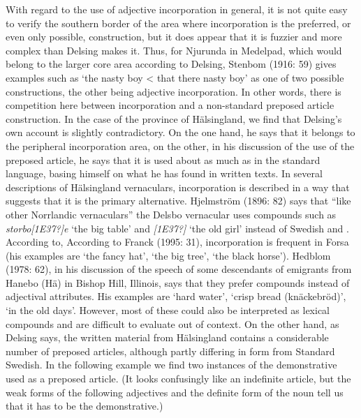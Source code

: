 With regard to the use of adjective incorporation in general, it is not quite easy to verify the southern border of the area where incorporation is the preferred, or even only possible, construction, but it does appear that it is fuzzier and more complex than Delsing makes it. Thus, for Njurunda in Medelpad, which would belong to the larger core area according to Delsing, Stenbom (1916: 59) gives examples such as  ‘the nasty boy {\textless} that there nasty boy’ as one of two possible constructions, the other being adjective incorporation. In other words, there is competition here between incorporation and a non-standard preposed article construction. In the case of the province of Hälsingland, we find that Delsing’s own account is slightly contradictory. On the one hand, he says that it belongs to the peripheral incorporation area, on the other, in his discussion of the use of the preposed article, he says that it is used about as much as in the standard language, basing himself on what he has found in written texts. In several descriptions of Hälsingland vernaculars, incorporation is described in a way that suggests that it is the primary alternative. Hjelmström (1896: 82) says that “like other Norrlandic vernaculars” the Delsbo vernacular uses compounds such as \textit{storbo[1E37?]e} ‘the big table’ and \textit{[1E37?]} ‘the old girl’ instead of Swedish  and . According to, According to Franck (1995: 31), incorporation is frequent in Forsa (his examples are ‘the fancy hat’, ‘the big tree’,  ‘the black horse’). Hedblom (1978: 62), in his discussion of the speech of some descendants of emigrants from Hanebo (Hä) in Bishop Hill, Illinois, says that they prefer compounds instead of adjectival attributes. His examples are  ‘hard water’,  ‘crisp bread (knäckebröd)’,  ‘in the old days’. However, most of these could also be interpreted as lexical compounds and are difficult to evaluate out of context. On the other hand, as Delsing says, the written material from Hälsingland contains a considerable number of preposed articles, although partly differing in form from Standard Swedish. In the following example we find two instances of the demonstrative  used as a preposed article. (It looks confusingly like an indefinite article, but the weak forms of the following adjectives and the definite form of the noun tell us that it has to be the demonstrative.) 

